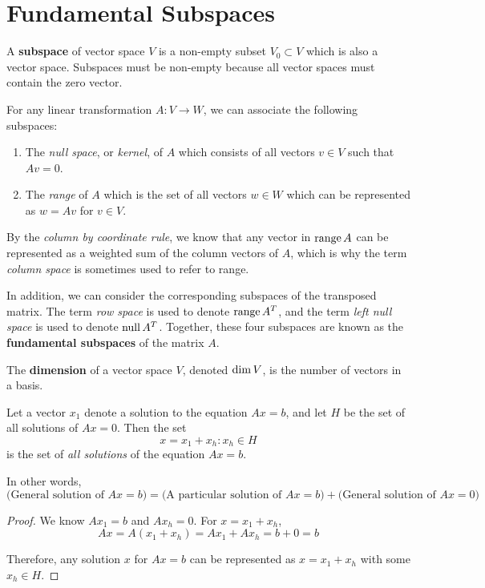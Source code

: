 \section{Fundamental Subspaces}

\begin{definition}
A \textbf{subspace} of vector space $V$ is a non-empty subset $V_{0} \subset V$ which is also a vector space. Subspaces must be non-empty because all vector spaces must contain the zero vector. 
\end{definition}

For any linear transformation $A : V \rightarrow W$, we can associate the following subspaces: 
\begin{enumerate}
	\item The \textit{null space}, or \textit{kernel}, of $A$ which consists of all vectors $v \in V$ such that $Av = 0$. 
	\item The \textit{range} of $A$ which is the set of all vectors $w \in W$ which can be represented as $w = Av$ for $v \in V$. 
\end{enumerate}

By the \textit{column by coordinate rule}, we know that any vector in $\operatorname{range} A$ can be represented as a weighted sum of the column vectors of $A$, which is why the term \textit{column space} is sometimes used to refer to range. 

In addition, we can consider the corresponding subspaces of the transposed matrix. The term \textit{row space} is used to denote $\operatorname{range} A^{T}$, and the term \textit{left null space} is used to denote $\operatorname{null} A^{T}$. Together, these four subspaces are known as the \textbf{fundamental subspaces} of the matrix $A$. 

\begin{definition}
The \textbf{dimension} of a vector space $V$, denoted $\operatorname{dim} V$, is the number of vectors in a basis. 
\end{definition}

\begin{theorem} 
Let a vector $x_{1}$ denote a solution to the equation $Ax = b$, and let $H$ be the set of all solutions of $Ax = 0$. Then the set
$$x = x_{1} + x_{h} : x_{h} \in H$$
is the set of \textit{all solutions} of the equation $Ax = b$. 

In other words, 
$$\Big(\text{General solution of $Ax=b$}\Big) = \Big(\text{A particular solution of $Ax=b$}\Big) + \Big(\text{General solution of $Ax=0$}\Big)$$
\end{theorem}
\begin{proof}
We know $Ax_{1} = b$ and $Ax_{h} = 0$. For $x = x_{1} + x_{h}$,
$$Ax = A(x_{1} + x_{h}) = Ax_{1} + Ax_{h} = b + 0 = b$$

Therefore, any solution $x$ for $Ax = b$ can be represented as $x = x_{1} + x_{h}$ with some $x_{h} \in H$. 
\end{proof}

